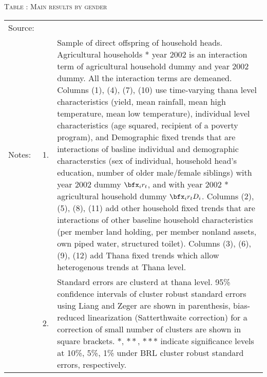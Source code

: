 \begin{table}
\hfil\textsc{\footnotesize Table \thetable: Main results by gender\label{MainGenderResults10Table}}\\
\setlength{\tabcolsep}{1pt}
\renewcommand{\arraystretch}{.55}
\hfil

\renewcommand{\arraystretch}{1}
\hfil\begin{tabular}{>{\hfill\scriptsize}p{1cm}<{}>{\hfill\scriptsize}p{.5cm}<{}>{\scriptsize}p{12cm}<{\hfill}}
Source:& \multicolumn{2}{l}{\scriptsize Compiled from IFPRI data. }\\[-1ex]
Notes:& 1. & Sample of direct offspring of household heads. \textsf{Agricultural households * year 2002} is an interaction term of agricultural household dummy and year 2002 dummy. All the interaction terms are demeaned. Columns \textsf{(1), (4), (7), (10)} use time-varying thana level characteristics (yield, mean rainfall, mean high temperature, mean low temperature), individual level characteristics (age squared, recipient of a poverty program), and \textsf{Demographic fixed trends} that are interactions of basline individual and demographic characterstics (sex of individual, household head's education, number of older male/female siblings) with year 2002 dummy $\bfx_{i}r_{t}$, and with year 2002 * agricultural household dummy $\bfx_{i}r_{t}D_{i}$. Columns \textsf{(2), (5), (8), (11)} add \textsf{other household fixed trends} that are interactions of other baseline household characteristics (per member land holding, per member nonland assets, own piped water, structured toilet). Columns \textsf{(3), (6), (9), (12)} add \textsf{Thana fixed trends} which allow heterogenous trends at Thana level. \\[-1ex]
& 2. & Standard errors are clusterd at thana level. 95\% confidence intervals of cluster robust standard errors using Liang and Zeger are shown in parenthesis, bias-reduced linearization (Satterthwaite correction) for a correction of small number of clusters are shown in square brackets. $*$, $**$, $***$ indicate significance levels at 10\%, 5\%, 1\% under BRL cluster robust standard errors, respectively.\end{tabular}
\end{table}

